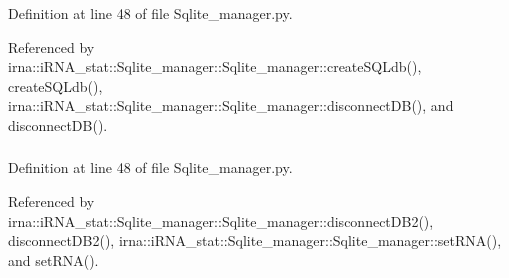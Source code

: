 \-Definition at line 48 of file \-Sqlite\-\_\-manager.\-py.



\-Referenced by irna\-::i\-R\-N\-A\-\_\-stat\-::\-Sqlite\-\_\-manager\-::\-Sqlite\-\_\-manager\-::create\-S\-Q\-Ldb(), create\-S\-Q\-Ldb(), irna\-::i\-R\-N\-A\-\_\-stat\-::\-Sqlite\-\_\-manager\-::\-Sqlite\-\_\-manager\-::disconnect\-D\-B(), and disconnect\-D\-B().

\hypertarget{classirna_1_1iRNA__pred_1_1Sqlite__manager_1_1Sqlite__manager_a6757d0d89fd278edd50e3aeef4884166}{
\subsubsection[{cur}]{}}
\label{classirna_1_1iRNA__pred_1_1Sqlite__manager_1_1Sqlite__manager_a6757d0d89fd278edd50e3aeef4884166}


\-Definition at line 48 of file \-Sqlite\-\_\-manager.\-py.



\-Referenced by irna\-::i\-R\-N\-A\-\_\-stat\-::\-Sqlite\-\_\-manager\-::\-Sqlite\-\_\-manager\-::disconnect\-D\-B2(), disconnect\-D\-B2(), irna\-::i\-R\-N\-A\-\_\-stat\-::\-Sqlite\-\_\-manager\-::\-Sqlite\-\_\-manager\-::set\-R\-N\-A(), and set\-R\-N\-A().

\hypertarget{classirna_1_1iRNA__pred_1_1Sqlite__manager_1_1Sqlite__manager_aacef37f4f6945d8676b524b8c50e227b}{
\subsubsection[{db\-\_\-file}]{}}
\label{classirna_1_1iRNA__pred_1_1Sqlite__manager_1_1Sqlite__manager_aacef37f4f6945d8676b524b8c50e227b}


